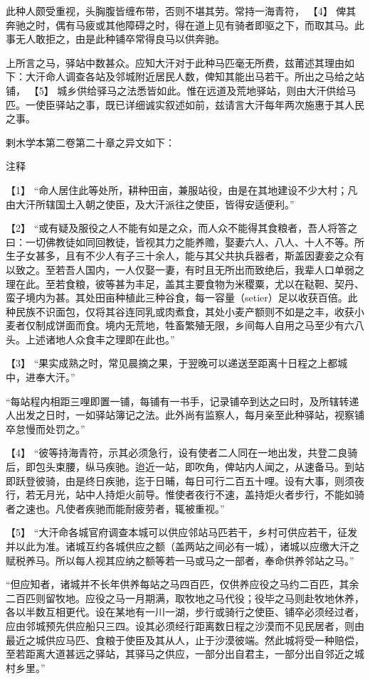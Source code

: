 \documentclass[12pt,UTF8]{ctexbook}
\begin{document}
此种人颇受重视，头胸腹皆缠布带，否则不堪其劳。常持一海青符， 【4】 俾其奔驰之时，偶有马疲或其他障碍之时，得在道上见有骑者即驱之下，而取其马。此事无人敢拒之，由是此种铺卒常得良马以供奔驰。

上所言之马，驿站中数甚众。应知大汗对于此种马匹毫无所费，兹莆述其理由如下：大汗命人调查各站及邻城附近居民人数，俾知其能出马若干。所出之马给之站铺， 【5】 城乡供给驿马之法悉皆如此。惟在远道及荒地驿站，则由大汗供给马匹。一使臣驿站之事，既已详细诚实叙述如前，兹请言大汗每年两次施惠于其人民之事。

剌木学本第二卷第二十章之异文如下：

注释

【1】 “命人居住此等处所，耕种田亩，兼服站役，由是在其地建设不少大村；凡由大汗所辖国土入朝之使臣，及大汗派往之使臣，皆得安适便利。”

【2】 “或有疑及服役之人不能有如是之众，而人众不能得其食粮者，吾人将答之曰：一切佛教徒如同回教徒，皆视其力之能养赡，娶妻六人、八人、十人不等。所生子女甚多，且有不少人有子三十余人，能与其父共执兵器者，斯盖因妻妾之众有以致之。至若吾人国内，一人仅娶一妻，有时且无所出而致绝后，我辈人口单弱之理在此。至若食粮，彼等甚为丰足，盖其主要食物为米稷粟，尤以在鞑靼、契丹、蛮子境内为甚。其处田亩种植此三种谷食，每一容量（setier）足以收获百倍。此种民族不识面包，仅将其谷连同乳或肉煮食，其处小麦产额则不如是之丰，收获小麦者仅制成饼面而食。境内无荒地，牲畜繁殖无限，乡间每人自用之马至少有六八头。上述诸地人众食丰之理即在此也。”

【3】 “果实成熟之时，常见晨摘之果，于翌晚可以递送至距离十日程之上都城中，进奉大汗。”

“每站程内相距三哩即置一铺，每铺有一书手，记录铺卒到达之曰时，及所辖转递人出发之日时，一如驿站簿记之法。此外尚有监察人，每月亲至此种驿站，视察铺卒怠慢而处罚之。”

【4】 “彼等持海青符，示其必须急行，设有使者二人同在一地出发，共登二良骑后，即包头束腰，纵马疾驰。迨近一站，即吹角，俾站内人闻之，从速备马。到站即跃登彼骑，由是终日疾驰，迄于日晡，每日可行二百五十哩。设有大事，则须夜行，若无月光，站中人持炬火前导。惟使者夜行不速，盖持炬火者步行，不能如骑者之速也。凡使者疾驰而能耐疲劳者，辄被重视。”

【5】 “大汗命各城官府调查本城可以供应邻站马匹若干，乡村可供应若干，征发并以此为准。诸城互约各城供应之额（盖两站之间必有一城），诸城以应缴大汗之赋税养马。所以每人视其应纳之额等若一马或马之一部者，奉命供养邻站之马。”

“但应知者，诸城并不长年供养每站之马四百匹，仅供养应役之马约二百匹，其余二百匹则留牧地。应役之马一月期满，取牧地之马代役；役毕之马则赴牧地休养，各以半数互相更代。设在某地有一川一湖，步行或骑行之使臣、铺卒必须经过者，应由邻城预先供应船只三四。设其必须经行距离数日程之沙漠而不见民居者，则由最近之城供应马匹、食粮于使臣及其从人，止于沙漠彼端。然此城将受一种赔偿，至若距离大道甚远之驿站，其驿马之供应，一部分出自君主，一部分出自邻近之城村乡里。”
\end{document}
